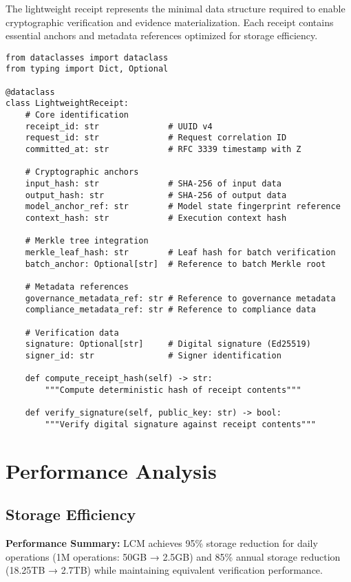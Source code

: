 \documentclass[12pt,a4paper]{article}
\begin{document}
The lightweight receipt represents the minimal data structure required to enable cryptographic verification and evidence materialization. Each receipt contains essential anchors and metadata references optimized for storage efficiency.

\begin{lstlisting}[caption={Lightweight Receipt Data Structure}]
from dataclasses import dataclass
from typing import Dict, Optional

@dataclass
class LightweightReceipt:
    # Core identification
    receipt_id: str              # UUID v4
    request_id: str              # Request correlation ID
    committed_at: str            # RFC 3339 timestamp with Z

    # Cryptographic anchors
    input_hash: str              # SHA-256 of input data
    output_hash: str             # SHA-256 of output data
    model_anchor_ref: str        # Model state fingerprint reference
    context_hash: str            # Execution context hash

    # Merkle tree integration
    merkle_leaf_hash: str        # Leaf hash for batch verification
    batch_anchor: Optional[str]  # Reference to batch Merkle root

    # Metadata references
    governance_metadata_ref: str # Reference to governance metadata
    compliance_metadata_ref: str # Reference to compliance data

    # Verification data
    signature: Optional[str]     # Digital signature (Ed25519)
    signer_id: str               # Signer identification

    def compute_receipt_hash(self) -> str:
        """Compute deterministic hash of receipt contents"""

    def verify_signature(self, public_key: str) -> bool:
        """Verify digital signature against receipt contents"""
\end{lstlisting}

\section{Performance Analysis}

\subsection{Storage Efficiency}

\begin{infobox}
\textbf{Performance Summary:} LCM achieves 95\% storage reduction for daily operations (1M operations: 50GB → 2.5GB) and 85\% annual storage reduction (18.25TB → 2.7TB) while maintaining equivalent verification performance.
\end{infobox}
\end{document}
